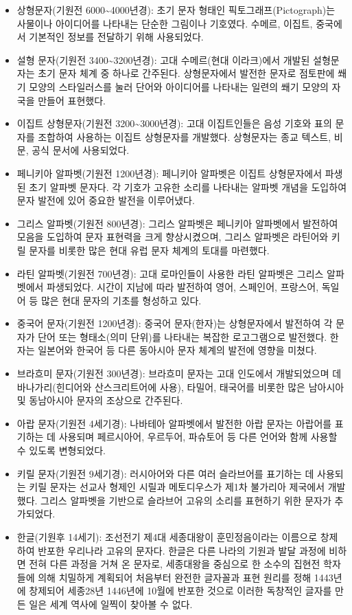 \documentclass[
  letterpaper,
]{book}
\begin{document}
\begin{itemize}
\item
  상형문자(기원전 6000\textasciitilde4000년경): 초기 문자 형태인
  픽토그래프(Pictograph)는 사물이나 아이디어를 나타내는 단순한 그림이나
  기호였다. 수메르, 이집트, 중국에서 기본적인 정보를 전달하기 위해
  사용되었다.
\item
  설형 문자(기원전 3400\textasciitilde3200년경): 고대 수메르(현대
  이라크)에서 개발된 설형문자는 초기 문자 체계 중 하나로 간주된다.
  상형문자에서 발전한 문자로 점토판에 쐐기 모양의 스타일러스를 눌러
  단어와 아이디어를 나타내는 일련의 쐐기 모양의 자국을 만들어 표현했다.
\item
  이집트 상형문자(기원전 3200\textasciitilde3000년경): 고대 이집트인들은
  음성 기호와 표의 문자를 조합하여 사용하는 이집트 상형문자를 개발했다.
  상형문자는 종교 텍스트, 비문, 공식 문서에 사용되었다.
\item
  페니키아 알파벳(기원전 1200년경): 페니키아 알파벳은 이집트
  상형문자에서 파생된 초기 알파벳 문자다. 각 기호가 고유한 소리를
  나타내는 알파벳 개념을 도입하여 문자 발전에 있어 중요한 발전을
  이루어냈다.
\item
  그리스 알파벳(기원전 800년경): 그리스 알파벳은 페니키아 알파벳에서
  발전하여 모음을 도입하여 문자 표현력을 크게 향상시켰으며, 그리스
  알파벳은 라틴어와 키릴 문자를 비롯한 많은 현대 유럽 문자 체계의 토대를
  마련했다.
\item
  라틴 알파벳(기원전 700년경): 고대 로마인들이 사용한 라틴 알파벳은
  그리스 알파벳에서 파생되었다. 시간이 지남에 따라 발전하여 영어,
  스페인어, 프랑스어, 독일어 등 많은 현대 문자의 기초를 형성하고 있다.
\item
  중국어 문자(기원전 1200년경): 중국어 문자(한자)는 상형문자에서
  발전하여 각 문자가 단어 또는 형태소(의미 단위)를 나타내는 복잡한
  로고그램으로 발전했다. 한자는 일본어와 한국어 등 다른 동아시아 문자
  체계의 발전에 영향을 미쳤다.
\item
  브라흐미 문자(기원전 300년경): 브라흐미 문자는 고대 인도에서
  개발되었으며 데바나가리(힌디어와 산스크리트어에 사용), 타밀어,
  태국어를 비롯한 많은 남아시아 및 동남아시아 문자의 조상으로 간주된다.
\item
  아랍 문자(기원전 4세기경): 나바테아 알파벳에서 발전한 아랍 문자는
  아랍어를 표기하는 데 사용되며 페르시아어, 우르두어, 파슈토어 등 다른
  언어와 함께 사용할 수 있도록 변형되었다.
\item
  키릴 문자(기원전 9세기경): 러시아어와 다른 여러 슬라브어를 표기하는 데
  사용되는 키릴 문자는 선교사 형제인 시릴과 메토디우스가 제1차 불가리아
  제국에서 개발했다. 그리스 알파벳을 기반으로 슬라브어 고유의 소리를
  표현하기 위한 문자가 추가되었다.
\item
  한글(기원후 14세기): 조선전기 제4대 세종대왕이 훈민정음이라는 이름으로
  창제하여 반포한 우리나라 고유의 문자다. 한글은 다른 나라의 기원과 발달
  과정에 비하면 전혀 다른 과정을 거쳐 온 문자로, 세종대왕을 중심으로 한
  소수의 집현전 학자들에 의해 치밀하게 계획되어 처음부터 완전한 글자꼴과
  표현 원리를 정해 1443년에 창제되어 세종28년 1446년에 10월에 반포한
  것으로 이러한 독창적인 글자를 만든 일은 세계 역사에 일찍이 찾아볼 수
  없다.
\end{itemize}
\end{document}
